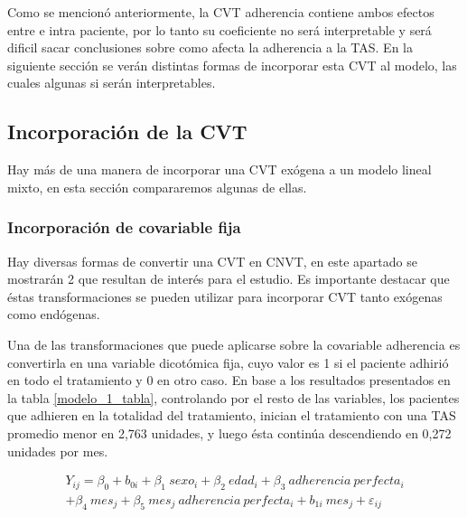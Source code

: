 \documentclass[spanish]{article}
\numberwithin{figure}{subsection}
\numberwithin{equation}{subsection}
\numberwithin{table}{subsection}
\begin{document}
Como se mencionó anteriormente, la CVT adherencia contiene ambos efectos entre e
intra paciente, por lo tanto su coeficiente no será interpretable y será dificil
sacar conclusiones sobre como afecta la adherencia a la TAS. En la siguiente
sección se verán distintas formas de incorporar esta CVT al modelo, las cuales
algunas si serán interpretables.

\subsection{Incorporación de la CVT}

Hay más de una manera de incorporar una CVT exógena a un modelo lineal mixto, en
esta sección compararemos algunas de ellas.

\subsubsection{Incorporación de covariable fija}

Hay diversas formas de convertir una CVT en CNVT, en este apartado se mostrarán
2 que resultan de interés para el estudio. Es importante destacar que éstas
transformaciones se pueden utilizar para incorporar CVT tanto exógenas como
endógenas.

Una de las transformaciones que puede aplicarse sobre la covariable adherencia
es convertirla en una variable dicotómica fija, cuyo valor es 1 si el paciente
adhirió en todo el tratamiento y 0 en otro caso. En base a los resultados
presentados en la tabla \ref{modelo_1_tabla}, controlando por el resto de las
variables, los pacientes que adhieren en la totalidad del tratamiento, inician
el tratamiento con una TAS promedio menor en 2,763 unidades, y luego ésta
continúa descendiendo en 0,272 unidades por mes.

\begin{multline}
	\label{modelo_1}
	Y_{ij} = \beta_0 + b_{0i} + \beta_1\ sexo_i + \beta_2\ edad_i + \beta_3\ adherencia\ perfecta_i \\
	+ \beta_4\ mes_j + \beta_5\ mes_j\ adherencia\ perfecta_i + b_{1i}\ mes_j + \varepsilon_{ij}
\end{multline}
\end{document}
